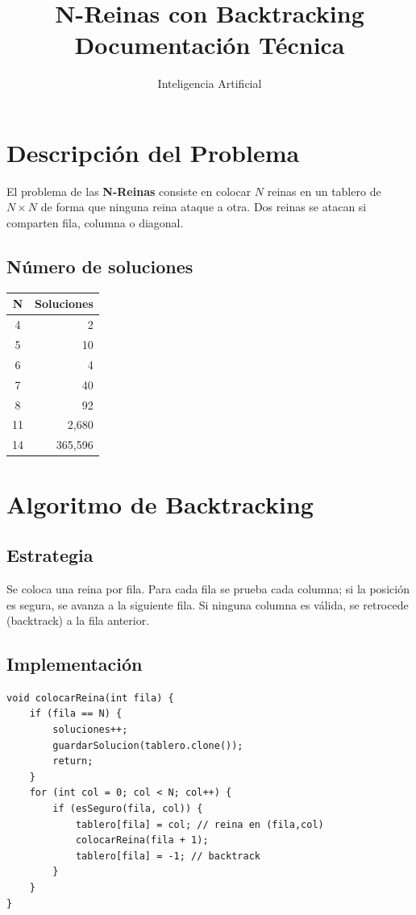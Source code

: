 \documentclass[12pt,a4paper]{article}
\title{\textbf{N-Reinas con Backtracking}\\
  \large Documentación Técnica}
\author{Inteligencia Artificial}
\date{}
\begin{document}
\maketitle
\tableofcontents
\newpage

\section{Descripción del Problema}
El problema de las \textbf{N-Reinas} consiste en colocar $N$ reinas en un tablero de $N \times N$ de forma que ninguna reina ataque a otra. Dos reinas se atacan si comparten fila, columna o diagonal.

\subsection{Número de soluciones}
\begin{center}
\begin{tabular}{|c|r|}
\hline
\textbf{N} & \textbf{Soluciones} \\
\hline
4  & 2 \\
5  & 10 \\
6  & 4 \\
7  & 40 \\
8  & 92 \\
11 & 2,680 \\
14 & 365,596 \\
\hline
\end{tabular}
\end{center}

\section{Algoritmo de Backtracking}

\subsection{Estrategia}
Se coloca una reina por fila. Para cada fila se prueba cada columna; si la posición es segura, se avanza a la siguiente fila. Si ninguna columna es válida, se retrocede (backtrack) a la fila anterior.

\subsection{Implementación}
\begin{lstlisting}
void colocarReina(int fila) {
    if (fila == N) {
        soluciones++;
        guardarSolucion(tablero.clone());
        return;
    }
    for (int col = 0; col < N; col++) {
        if (esSeguro(fila, col)) {
            tablero[fila] = col; // reina en (fila,col)
            colocarReina(fila + 1);
            tablero[fila] = -1; // backtrack
        }
    }
}
\end{lstlisting}
\end{document}
